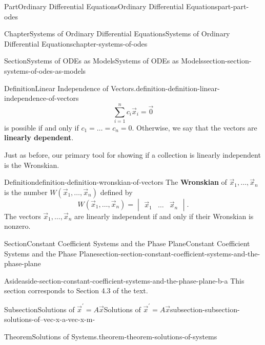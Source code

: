 \documentclass[twoside,10pt,]{book}
\newcommand{\terminology}[1]{\textbf{#1}}
\numberwithin{equation}{part}
\begin{document}
\begin{partptx}{Part}{Ordinary Differential Equations}{}{Ordinary Differential Equations}{}{}{part-part-odes}
\begin{chapterptx}{Chapter}{Systems of Ordinary Differential Equations}{}{Systems of Ordinary Differential Equations}{}{}{chapter-systems-of-odes}
\begin{sectionptx}{Section}{Systems of ODEs as Models}{}{Systems of ODEs as Models}{}{}{section-section-systems-of-odes-as-models}
\begin{definition}{Definition}{Linear Independence of Vectors.}{definition-definition-linear-independence-of-vectors}
\begin{equation*}
\sum_{i=1}^{n}c_{i}\vec{x}_{i} = \vec{0}
\end{equation*}
is possible if and only if \(c_{1}=\dots=c_{n}=0\). Otherwise, we say that the vectors are \terminology{linearly dependent}.%
\end{definition}
Just as before, our primary tool for showing if a collection is linearly independent is the Wronskian.%
\begin{definition}{Definition}{}{definition-definition-wronskian-of-vectors}%
%
The \terminology{Wronskian} of \(\vec{x}_{1},\dots,\vec{x}_{n}\) is the number \(W(\vec{x}_{1},\dots,\vec{x}_{n})\) defined by%
\begin{equation*}
W(\vec{x}_{1},\dots,\vec{x}_{n}) = \begin{vmatrix}\vec{x}_{1}  &  \dots   &  \vec{x}_{n}\end{vmatrix}.
\end{equation*}
The vectors \(\vec{x}_{1},\dots,\vec{x}_{n}\) are linearly independent if and only if their Wronskian is nonzero.%
\end{definition}
\end{sectionptx}
%
%
\typeout{************************************************}
\typeout{************************************************}
%
\begin{sectionptx}{Section}{Constant Coefficient Systems and the Phase Plane}{}{Constant Coefficient Systems and the Phase Plane}{}{}{section-section-constant-coefficient-systems-and-the-phase-plane}
\begin{introduction}{}%
\begin{aside}{Aside}{}{aside-section-constant-coefficient-systems-and-the-phase-plane-b-a}%
This section corresponds to Section 4.3 of the text.%
\end{aside}
\end{introduction}%
%
%
\typeout{************************************************}
\typeout{************************************************}
%
\begin{subsectionptx}{Subsection}{Solutions of \(\vec{x}^\prime = A\vec{x}\)}{}{Solutions of \(\vec{x}^\prime = A\vec{x}\)}{}{}{subsection-subsection-solutions-of--vec-x-a-vec-x-m-}
\begin{theorem}{Theorem}{Solutions of Systems.}{}{theorem-theorem-solutions-of-systems}%

\end{theorem}
\end{subsectionptx}
\end{sectionptx}
\end{chapterptx}
\end{partptx}
\end{document}
